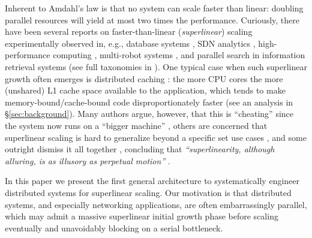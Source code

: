 Inherent to Amdahl's law is that no system can scale faster than linear: doubling parallel resources will yield at most two times the performance. Curiously, there have been several reports on faster-than-linear (\emph{superlinear}) scaling experimentally observed in, e.g., database systems \cite{scalability-analyzed, 10.5555/1012889.1012894}, SDN analytics \cite{sdn-analytitcs}, high-performance computing \cite{556383, 7733347, 6483679}, multi-robot systems \cite{10.1007/978-3-319-77610-1}, and parallel search in information retrieval systems \cite{dobb-1, dobb-2} (see full taxonomies in \cite{7733347, 80148}).
One typical case when such superlinear growth often emerges is distributed caching \cite{271208, 10.5555/1012889.1012894, dobb-2}: the more CPU cores the more (unshared) L1 cache space available to the application, which tends to make memory-bound\slash cache-bound code disproportionately faster \cite{80148} (see an analysis in \S\ref{sec:background}).  Many authors argue, however, that this is ``cheating'' \cite{gunther-hotsos, 10.1145/2773212.2789974} since the system now runs on a ``bigger machine'' \cite{80148}, others are concerned that superlinear scaling is hard to generalize beyond a specific set use cases \cite{7733347, 80148}, and some outright dismiss it all together \cite{gunther-hotsos, 10.1016/0167-8191(86)90024-4}, concluding that \emph{``superlinearity, although alluring, is as illusory as perpetual motion''} \cite{10.1145/2773212.2789974}.

In this paper we present the first general architecture to systematically engineer distributed systems for superlinear scaling. Our motivation is that distributed systems, and especially networking applications, are often embarrassingly parallel, %
which may admit a massive superlinear initial growth phase before scaling eventually and unavoidably blocking on a serial bottleneck.

